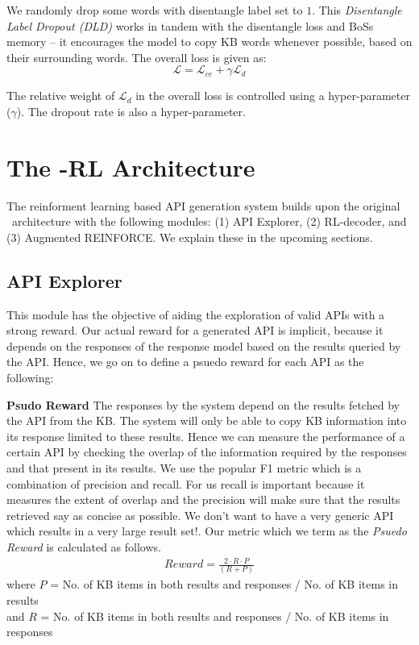 We randomly drop some words with disentangle label set to $1$. This \textit{Disentangle Label Dropout (DLD)} works in tandem with the disentangle loss and {\sc BoSs} memory -- it encourages the model to copy KB words whenever possible, based on their surrounding words. The overall loss is given as:
\begin{equation}
\mathcal{L} = \mathcal{L}_{ce} + \gamma \mathcal{L}_{d}
\label{eqn:loss}
\end{equation}

The relative weight of $\mathcal{L}_{d}$ in the overall loss is controlled using a hyper-parameter ($\gamma$). The dropout rate is also a hyper-parameter.

\section{The \sys -RL Architecture}
The reinforment learning based API generation system builds upon the original \sys\ architecture with the following modules: (1) API Explorer, (2) RL-decoder, and (3) Augmented REINFORCE. We explain these in the upcoming sections.

\subsection{API Explorer}
This module has the objective of aiding the exploration of valid APIs with a strong reward. Our actual reward for a generated API is implicit, because it depends on the responses of the response model based on the results queried by the API. Hence, we go on to define a psuedo reward for each API as the following:

\noindent\textbf{Psudo Reward}
\label{ssec:PsReward}
The responses by the system depend on the results fetched by the API from the KB. The system will only be able to copy KB information into its response limited to these results. Hence we can measure the performance of a certain API by checking the overlap of the information required by the responses and that present in its results. We use the popular F1 metric which is a combination of precision and recall. For us recall is important because it measures the extent of overlap and the precision will make sure that the results retrieved say as concise as possible. We don't want to have a very generic API which results in a very large result set!. Our metric which we term as the {\em Psuedo Reward} is calculated as follows.
\begin{gather}
Reward = \frac{2 \cdot R \cdot P}{(R + P)}
\end{gather}
where $P$ = No. of KB items in both results and responses / No. of KB items in results \\ and $R$ = No. of KB items in both results and responses / No. of KB items in responses

